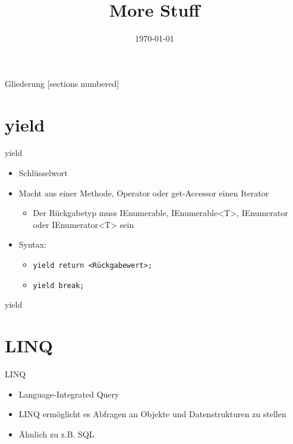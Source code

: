 



\title{More Stuff}
\date{\today}




\maketitle

\begin{frame}{Gliederung}
	[sections numbered]
	\tableofcontents
\end{frame}


\section{yield}
\begin{frame}{yield}
	\begin{itemize}
		\item Schlüsselwort
		\item Macht aus einer Methode, Operator oder get-Accessor einen Iterator
		\begin{itemize}
			\item Der Rückgabetyp muss \alert{IEnumerable}, \alert{IEnumerable<T>}, \alert{IEnumerator} oder \alert{IEnumerator<T>} sein
		\end{itemize}
		\item Syntax:
		\begin{itemize}
			\item \texttt{\alert{yield} return \alert{<Rückgabewert>};}
			\item \texttt{\alert{yield} break;}
		\end{itemize}
	\end{itemize}
\end{frame}

\begin{frame}{yield}
		
\end{frame}

\section{LINQ}
\begin{frame}{LINQ}
	\begin{itemize}
		\item Language-Integrated Query
		\item LINQ ermöglicht es Abfragen an Objekte und Datenstrukturen zu stellen
		\item Ähnlich zu z.B. SQL
	\end{itemize}
\end{frame}


